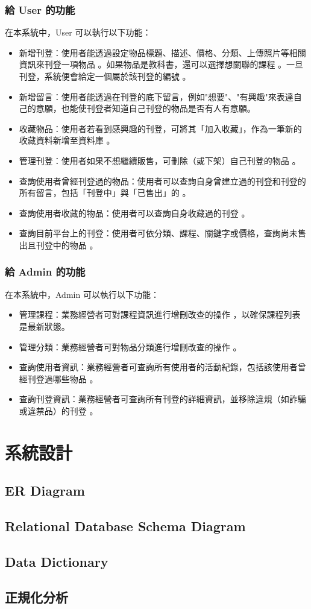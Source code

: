 \documentclass[a4paper]{article}
\begin{document}
\subsubsection{給 User 的功能}
在本系統中，User 可以執行以下功能：
\begin{itemize}
    \item 新增刊登：使用者能透過設定物品標題、描述、價格、分類、上傳照片等相關資訊來刊登一項物品 。如果物品是教科書，還可以選擇想關聯的課程 。一旦刊登，系統便會給定一個屬於該刊登的編號 。
    \item 新增留言：使用者能透過在刊登的底下留言，例如"想要"、"有興趣"來表達自己的意願，也能使刊登者知道自己刊登的物品是否有人有意願。
    \item 收藏物品：使用者若看到感興趣的刊登，可將其「加入收藏」，作為一筆新的收藏資料新增至資料庫 。
    \item 管理刊登：使用者如果不想繼續販售，可刪除（或下架）自己刊登的物品 。
    \item 查詢使用者曾經刊登過的物品：使用者可以查詢自身曾建立過的刊登和刊登的所有留言，包括「刊登中」與「已售出」的 。
    \item 查詢使用者收藏的物品：使用者可以查詢自身收藏過的刊登 。
    \item 查詢目前平台上的刊登：使用者可依分類、課程、關鍵字或價格，查詢尚未售出且刊登中的物品 。
\end{itemize}

\subsubsection{給 Admin 的功能}
在本系統中，Admin 可以執行以下功能：
\begin{itemize}
    \item 管理課程：業務經營者可對課程資訊進行增刪改查的操作 ，以確保課程列表是最新狀態。
    \item 管理分類：業務經營者可對物品分類進行增刪改查的操作 。
    \item 查詢使用者資訊：業務經營者可查詢所有使用者的活動紀錄，包括該使用者曾經刊登過哪些物品 。
    \item 查詢刊登資訊：業務經營者可查詢所有刊登的詳細資訊，並移除違規（如詐騙或違禁品）的刊登 。
\end{itemize}

\section{系統設計}
\subsection{ER Diagram}
\subsection{Relational Database Schema Diagram}
\subsection{Data Dictionary}
\subsection{正規化分析}
\end{document}

